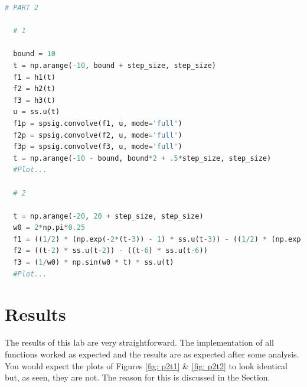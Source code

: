 \documentclass[12pt]{report}
\begin{document}
\begin{lstlisting}[language=Python, basicstyle=\footnotesize]
  # PART 2

  # 1

  bound = 10
  t = np.arange(-10, bound + step_size, step_size)
  f1 = h1(t)
  f2 = h2(t)
  f3 = h3(t)
  u = ss.u(t)
  f1p = spsig.convolve(f1, u, mode='full')
  f2p = spsig.convolve(f2, u, mode='full')
  f3p = spsig.convolve(f3, u, mode='full')
  t = np.arange(-10 - bound, bound*2 + .5*step_size, step_size)
  #Plot...

  # 2

  t = np.arange(-20, 20 + step_size, step_size)
  w0 = 2*np.pi*0.25
  f1 = ((1/2) * (np.exp(-2*(t-3)) - 1) * ss.u(t-3)) - ((1/2) * (np.exp(-2*(t)) - 1) * ss.u(t))
  f2 = ((t-2) * ss.u(t-2)) - ((t-6) * ss.u(t-6))
  f3 = (1/w0) * np.sin(w0 * t) * ss.u(t)
  #Plot...
\end{lstlisting}

\section{Results}
The results of this lab are very straightforward. The implementation of all functions worked as expected and the results are as expected after some analysis. You would
expect the plots of Figures \ref{fig: p2t1} \& \ref{fig: p2t2} to look identical but, as seen, they are not. The reason for this is discussed in the 
Section.
\end{document}
